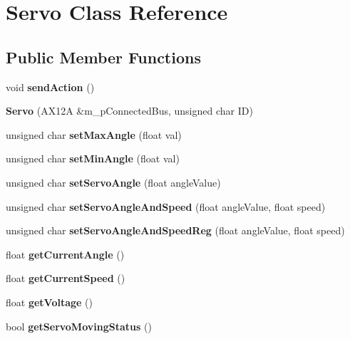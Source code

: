 \hypertarget{class_servo}{}\section{Servo Class Reference}
\label{class_servo}
\subsection*{Public Member Functions}
\begin{DoxyCompactItemize}
\item 
\mbox{\label{class_servo_ad225441da36c0aaa743601c72ca0a7ae}} 
void {\bfseries send\+Action} ()
\item 
\mbox{\label{class_servo_affd2df4e8de8de0114398c04a4e6d6e0}} 
{\bfseries Servo} (A\+X12A \&m\+\_\+p\+Connected\+Bus, unsigned char ID)
\item 
\mbox{\label{class_servo_aff9741ce884a22efcaa6476005db74d4}} 
unsigned char {\bfseries set\+Max\+Angle} (float val)
\item 
\mbox{\label{class_servo_a3cc0174ac451eea0391a27d40b15deda}} 
unsigned char {\bfseries set\+Min\+Angle} (float val)
\item 
\mbox{\label{class_servo_ab0e99ff577c85efda55a4a44012e7e22}} 
unsigned char {\bfseries set\+Servo\+Angle} (float angle\+Value)
\item 
\mbox{\label{class_servo_a8ba146e7578f05ce76b13526eb9cf89c}} 
unsigned char {\bfseries set\+Servo\+Angle\+And\+Speed} (float angle\+Value, float speed)
\item 
\mbox{\label{class_servo_a52a01b9ab1aef5a18944d4d96d151510}} 
unsigned char {\bfseries set\+Servo\+Angle\+And\+Speed\+Reg} (float angle\+Value, float speed)
\item 
\mbox{\label{class_servo_a2795b7f04aac2ee0110128acdf6d1fda}} 
float {\bfseries get\+Current\+Angle} ()
\item 
\mbox{\label{class_servo_aeb0408465d5103b36dbe2292e687b7ad}} 
float {\bfseries get\+Current\+Speed} ()
\item 
\mbox{\label{class_servo_ac63931cef1061090179af93a6e5d5155}} 
float {\bfseries get\+Voltage} ()
\item 
\mbox{\label{class_servo_ab730d826b45f07ad0c38b594f53b80d9}} 
bool {\bfseries get\+Servo\+Moving\+Status} ()
\end{DoxyCompactItemize}
